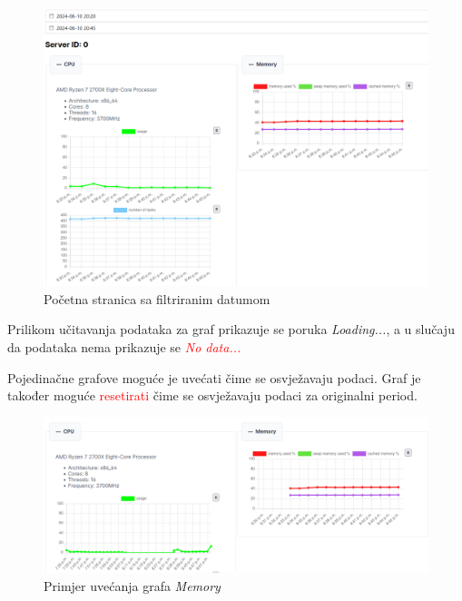 \documentclass[zavrsnirad]{fer}
\begin{document}
\begin{figure}[htb]
	\centering
	\includegraphics[width=1\linewidth]{images/web_2.png} 
	\caption{Početna stranica sa filtriranim datumom}
\end{figure}
\FloatBarrier
Prilikom učitavanja podataka za graf prikazuje se poruka \textit{Loading...}, a u slučaju da podataka nema prikazuje se \textcolor{red}{\textit{No data...}}

Pojedinačne grafove moguće je uvećati čime se osvježavaju podaci. Graf je također moguće \textcolor{red}{resetirati} čime se osvježavaju podaci za originalni period.
\begin{figure}[htb]
	\centering
	\includegraphics[width=1\linewidth]{images/web_3.png} 
	\caption{Primjer uvećanja grafa \textit{Memory}}
\end{figure}
\FloatBarrier
\end{document}
